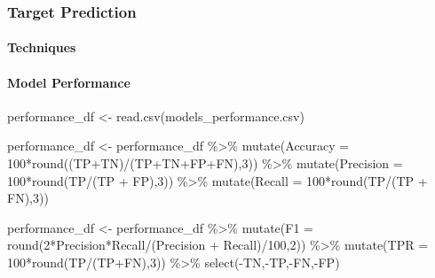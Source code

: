 \documentclass[preprint, 3p,
authoryear]{elsarticle} %
\newenvironment{Shaded}{\begin{snugshade}}{\end{snugshade}}
\newcommand{\AttributeTok}[1]{\textcolor[rgb]{0.77,0.63,0.00}{#1}}
\newcommand{\DecValTok}[1]{\textcolor[rgb]{0.00,0.00,0.81}{#1}}
\newcommand{\FunctionTok}[1]{\textcolor[rgb]{0.00,0.00,0.00}{#1}}
\newcommand{\NormalTok}[1]{#1}
\newcommand{\OtherTok}[1]{\textcolor[rgb]{0.56,0.35,0.01}{#1}}
\newcommand{\SpecialCharTok}[1]{\textcolor[rgb]{0.00,0.00,0.00}{#1}}
\newcommand{\StringTok}[1]{\textcolor[rgb]{0.31,0.60,0.02}{#1}}
\begin{document}
\hypertarget{target-prediction}{%
\subsubsection{Target Prediction}\label{target-prediction}}

\hypertarget{techniques}{%
\paragraph{Techniques}\label{techniques}}

\hypertarget{model-performance}{%
\paragraph{Model Performance}\label{model-performance}}

\begin{Shaded}
\begin{Highlighting}[]
\NormalTok{performance\_df }\OtherTok{\textless{}{-}} \FunctionTok{read.csv}\NormalTok{(}\StringTok{\textquotesingle{}models\_performance.csv\textquotesingle{}}\NormalTok{)}

\NormalTok{performance\_df }\OtherTok{\textless{}{-}}\NormalTok{ performance\_df }\SpecialCharTok{\%\textgreater{}\%}
  \FunctionTok{mutate}\NormalTok{(}\AttributeTok{Accuracy =} \DecValTok{100}\SpecialCharTok{*}\FunctionTok{round}\NormalTok{((TP}\SpecialCharTok{+}\NormalTok{TN)}\SpecialCharTok{/}\NormalTok{(TP}\SpecialCharTok{+}\NormalTok{TN}\SpecialCharTok{+}\NormalTok{FP}\SpecialCharTok{+}\NormalTok{FN),}\DecValTok{3}\NormalTok{)) }\SpecialCharTok{\%\textgreater{}\%}
  \FunctionTok{mutate}\NormalTok{(}\AttributeTok{Precision =} \DecValTok{100}\SpecialCharTok{*}\FunctionTok{round}\NormalTok{(TP}\SpecialCharTok{/}\NormalTok{(TP }\SpecialCharTok{+}\NormalTok{ FP),}\DecValTok{3}\NormalTok{)) }\SpecialCharTok{\%\textgreater{}\%}
  \FunctionTok{mutate}\NormalTok{(}\AttributeTok{Recall =} \DecValTok{100}\SpecialCharTok{*}\FunctionTok{round}\NormalTok{(TP}\SpecialCharTok{/}\NormalTok{(TP }\SpecialCharTok{+}\NormalTok{ FN),}\DecValTok{3}\NormalTok{))}

\NormalTok{performance\_df }\OtherTok{\textless{}{-}}\NormalTok{ performance\_df }\SpecialCharTok{\%\textgreater{}\%}
  \FunctionTok{mutate}\NormalTok{(}\AttributeTok{F1 =} \FunctionTok{round}\NormalTok{(}\DecValTok{2}\SpecialCharTok{*}\NormalTok{Precision}\SpecialCharTok{*}\NormalTok{Recall}\SpecialCharTok{/}\NormalTok{(Precision }\SpecialCharTok{+}\NormalTok{ Recall)}\SpecialCharTok{/}\DecValTok{100}\NormalTok{,}\DecValTok{2}\NormalTok{)) }\SpecialCharTok{\%\textgreater{}\%}
  \FunctionTok{mutate}\NormalTok{(}\AttributeTok{TPR =} \DecValTok{100}\SpecialCharTok{*}\FunctionTok{round}\NormalTok{(TP}\SpecialCharTok{/}\NormalTok{(TP}\SpecialCharTok{+}\NormalTok{FN),}\DecValTok{3}\NormalTok{)) }\SpecialCharTok{\%\textgreater{}\%}
  \FunctionTok{select}\NormalTok{(}\SpecialCharTok{{-}}\NormalTok{TN,}\SpecialCharTok{{-}}\NormalTok{TP,}\SpecialCharTok{{-}}\NormalTok{FN,}\SpecialCharTok{{-}}\NormalTok{FP)}



\end{Highlighting}
\end{Shaded}
\end{document}
